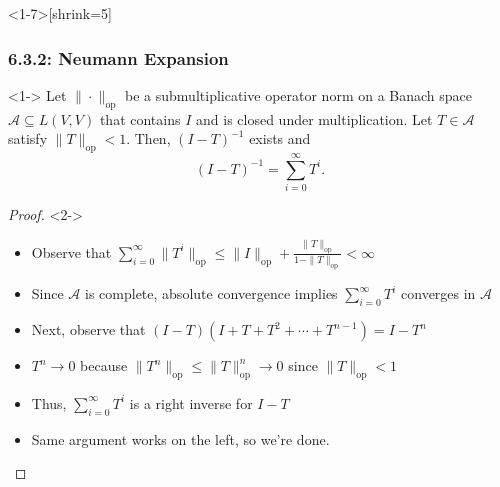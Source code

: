 \documentclass[10pt,english,aspectratio=169]{beamer}
\begin{document}
\begin{frame}<1-7>[shrink=5] \frametitle{6.3.2: Neumann Expansion}

\vspace{-1mm}

\begin{theorem}<1->
Let $\| \cdot \|_{\mathrm{op}}$ be a submultiplicative operator norm on a Banach space $\mathcal{A}\subseteq L(V,V)$ that contains $I$ and is closed under multiplication.
Let $T\in\mathcal{A}$ satisfy $\|T\|_{\mathrm{op}}<1$.
Then, $(I-T)^{-1}$ exists and \vspace{-2mm}
\[ (I-T)^{-1} = \sum_{i=0}^{\infty} T^i. \]
\end{theorem}
\begin{proof}<2->
\begin{itemize}
\item<2-> Observe that $\sum_{i=0}^{\infty} \| T^i \|_{\mathrm{op}} \leq \|I\|_{\mathrm{op}} + \frac{\|T\|_{\mathrm{op}}}{1-\|T\|_{\mathrm{op}}}<\infty$ \vspace{1mm}

\item<3-> Since $\mathcal{A}$ is complete, absolute convergence implies $\sum_{i=0}^{\infty} T^i$ converges in $\mathcal{A}$ \vspace{1mm}

\item<4-> Next, observe that $(I - T) \left( I + T + T^2 + \cdots + T^{n-1} \right) = I - T^n $ \vspace{1mm}

\item<5-> $T^n \to 0$ because $\|T^n\|_{\mathrm{op}} \leq \|T\|_{\mathrm{op}}^n \to 0$ since $\|T\|_{\mathrm{op}}<1$ \vspace{1mm}

\item<6-> Thus, $\sum_{i=0}^{\infty} T^i$ is a right inverse for $I-T$ \vspace{1mm}

\item<7-> Same argument works on the left, so we're done. \hfill \qedhere

\end{itemize}
\end{proof}

\end{frame}
\end{document}
